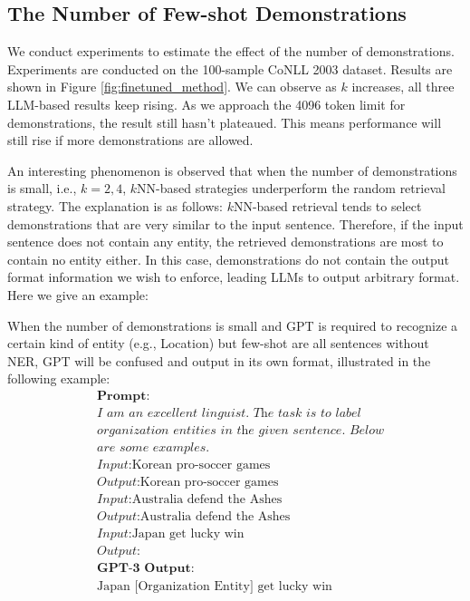 \documentclass[11pt]{article}
\begin{document}
\subsection{The Number of Few-shot Demonstrations}
We conduct experiments to estimate the effect of the number of demonstrations. 
Experiments are conducted on the 100-sample CoNLL 2003 dataset.
Results are shown in Figure \ref{fig:finetuned_method}. We can observe as $k$ increases, all three LLM-based results keep rising.
As we approach the 4096 token limit for demonstrations, the result still hasn't plateaued.
This means performance will still rise if more demonstrations are allowed. 

An interesting phenomenon is observed that when the number of demonstrations is small, i.e., $k=2,4$,
$k$NN-based strategies underperform the random retrieval strategy.
The explanation is as follows: $k$NN-based retrieval tends to select demonstrations that are very similar to the input sentence.
Therefore, 
 if the input sentence does not contain any entity, the retrieved demonstrations are most to contain no entity either.
 In this case, demonstrations do not contain the output format information we wish to enforce, leading LLMs to output arbitrary format.
 Here we give an example:
 
When the number of demonstrations is small and GPT is required to recognize a certain kind of entity (e.g., Location) but few-shot are all sentences without NER, GPT will be confused and output in its own format, illustrated in the following example:
\begin{equation}
\nonumber
    \begin{aligned}
    	&\textbf{Prompt:}\\
    	&\textit{I am an excellent linguist. The task is to label}\\
    	&\textit{organization entities in the given sentence. Below}\\
    	&\textit{are some examples.} \\
    	&\textit{Input:}\text{Korean pro-soccer games}\\
    	&\textit{Output:}\text{Korean pro-soccer games}\\
    	&\textit{Input:}\text{Australia defend the Ashes}\\
    	&\textit{Output:}\text{Australia defend the Ashes}\\
    	&\textit{Input:}\text{Japan get lucky win}\\
    	&\textit{Output:}\\
    	&\textbf{GPT-3 Output:}\\
    	&\text{Japan [Organization Entity] get lucky win}
    \end{aligned}
\end{equation}
\end{document}
